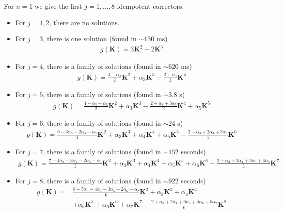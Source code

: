 \documentclass{article}
\theoremstyle{plain}
\theoremstyle{definition}
\theoremstyle{remark}
\newcommand{\vK}{\mathbf{K}}
\begin{document}
For $n=1$ we give the first $j=1,\dots, 8$ idempotent correctors:
\begin{itemize}
    \item For $j=1, 2$, there are no solutions.
    \item {For $j=3$, there is one solution (found in $\sim130$ ms)
          \begin{align*}
              g(\vK) = 3 \vK^2 - 2 \vK^3
          \end{align*}
          }
    \item {For $j=4$, there is a family of solutions (found in $\sim620$ ms)
          \begin{align*}
              g(\vK) = \frac{4 - \alpha_3}{2} \vK^2 + \alpha_3 \vK^3 - \frac{2 + \alpha_3}{2} \vK^4
          \end{align*}
          }
    \item {For $j=5$, there is a family of solutions (found in $\sim3.8$ s)
          \begin{align*}
              g(\vK) = \frac{4 - \alpha_3 + \alpha_5}{2} \vK^2 + \alpha_3 \vK^3 - \frac{2 + \alpha_3 + 3\alpha_5}{2} \vK^4 + \alpha_5  \vK^5
          \end{align*}
          }
    \item {For $j=6$, there is a family of solutions (found in $\sim24$ s)
          \begin{align*}
              g(\vK) = \frac{6 - 3\alpha_3 - 2\alpha_4 - \alpha_5}{4} \vK^2 + \alpha_3 \vK^3 + \alpha_4 \vK^4 + \alpha_5  \vK^5 - \frac{2 + \alpha_3 + 2\alpha_4 + 3 \alpha_5}{4} \vK^6
          \end{align*}
          }
    \item {For $j=7$, there is a family of solutions (found in $\sim152$ seconds)
          \begin{align*}
              g(\vK) = \frac{7 - 4\alpha_3 - 3 \alpha_4 - 2\alpha_5 - \alpha_6}{5} \vK^2 + \alpha_3 \vK^3 + \alpha_4 \vK^4 + \alpha_5  \vK^5 + \alpha_6 \vK^6 - \frac{2 + \alpha_3 + 2\alpha_4 + 3 \alpha_5 + 4 \alpha_6}{5} \vK^7
          \end{align*}
          }
    \item {For $j=8$, there is a family of solutions (found in $\sim922$ seconds)
          \begin{align*}
              g(\vK) = & \frac{8 - 5\alpha_3 - 4 \alpha_4 - 3\alpha_5 - 2\alpha_6 - \alpha_7}{6} \vK^2 + \alpha_3 \vK^3 + \alpha_4 \vK^4                      \\
                       & + \alpha_5  \vK^5 + \alpha_6 \vK^6 + \alpha_7 \vK^7 - \frac{2 + \alpha_3 + 2\alpha_4 + 3 \alpha_5 + 4\alpha_6 + 5 \alpha_7}{6} \vK^8
          \end{align*}
          }

\end{itemize}
\end{document}
